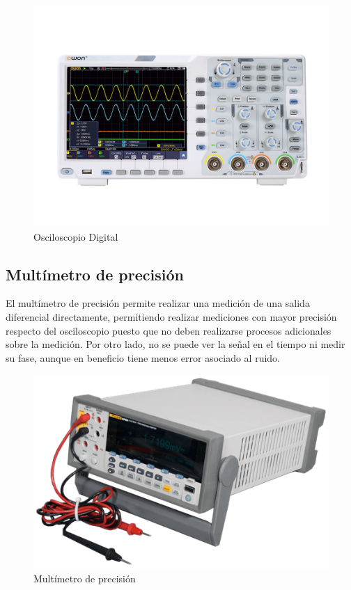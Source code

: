 \begin{figure}[H]
    \centering
        \includegraphics[scale=.8]{Recursos/oscilloscope.png}
    \caption{Osciloscopio Digital}
    \label{fig:osciloscopio}
\end{figure}

\subsection{Mult\'imetro de precisi\'on}
El mult\'imetro de precisi\'on permite realizar una medici\'on de una salida diferencial directamente, permitiendo realizar mediciones con mayor precisi\'on respecto del osciloscopio puesto que
no deben realizarse procesos adicionales sobre la medici\'on. Por otro lado, no se puede ver la se\~nal en el tiempo ni medir su fase, aunque en beneficio tiene menos error asociado al ruido.

\begin{figure}[H]
    \centering
        \includegraphics[scale=0.5]{Recursos/precision.png}
    \caption{Mult\'imetro de precisi\'on}
    \label{fig:multimetro}
\end{figure}

